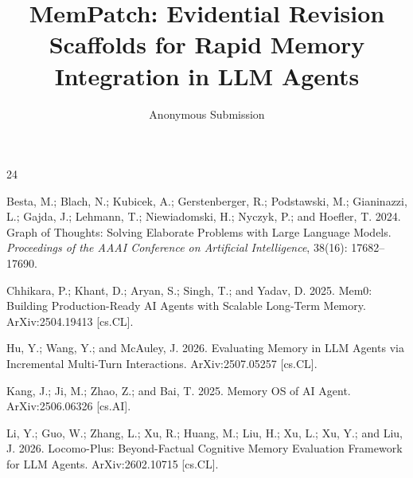\documentclass[letterpaper]{article}
\title{MemPatch: Evidential Revision Scaffolds for Rapid Memory Integration in LLM Agents}
\author{Anonymous Submission}
\begin{document}
\maketitle

\begin{abstract}

\end{abstract}










\begin{thebibliography}{24}
\providecommand{\natexlab}[1]{#1}

Besta, M.; Blach, N.; Kubicek, A.; Gerstenberger, R.; Podstawski, M.;
  Gianinazzi, L.; Gajda, J.; Lehmann, T.; Niewiadomski, H.; Nyczyk, P.; and
  Hoefler, T. 2024.
\newblock Graph of {Thoughts}: {Solving} {Elaborate} {Problems} with {Large}
  {Language} {Models}.
\newblock \emph{Proceedings of the AAAI Conference on Artificial Intelligence},
  38(16): 17682--17690.

Chhikara, P.; Khant, D.; Aryan, S.; Singh, T.; and Yadav, D. 2025.
\newblock Mem0: {Building} {Production}-{Ready} {AI} {Agents} with {Scalable}
  {Long}-{Term} {Memory}.
\newblock ArXiv:2504.19413 [cs.CL].

Hu, Y.; Wang, Y.; and McAuley, J. 2026.
\newblock Evaluating {Memory} in {LLM} {Agents} via {Incremental}
  {Multi}-{Turn} {Interactions}.
\newblock ArXiv:2507.05257 [cs.CL].

Kang, J.; Ji, M.; Zhao, Z.; and Bai, T. 2025.
\newblock Memory {OS} of {AI} {Agent}.
\newblock ArXiv:2506.06326 [cs.AI].

Li, Y.; Guo, W.; Zhang, L.; Xu, R.; Huang, M.; Liu, H.; Xu, L.; Xu, Y.; and
  Liu, J. 2026.
\newblock Locomo-{Plus}: {Beyond}-{Factual} {Cognitive} {Memory} {Evaluation}
  {Framework} for {LLM} {Agents}.
\newblock ArXiv:2602.10715 [cs.CL].


\end{thebibliography}
\end{document}
